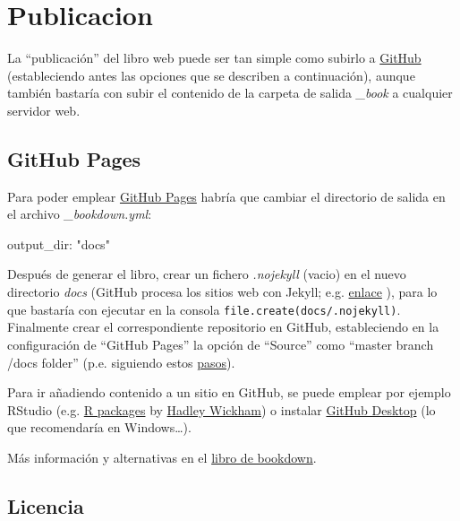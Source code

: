 \documentclass[]{book}
\newenvironment{Shaded}{\begin{snugshade}}{\end{snugshade}}
\newcommand{\StringTok}[1]{\textcolor[rgb]{0.31,0.60,0.02}{#1}}
\newcommand{\FunctionTok}[1]{\textcolor[rgb]{0.00,0.00,0.00}{#1}}
\newcommand{\AttributeTok}[1]{\textcolor[rgb]{0.77,0.63,0.00}{#1}}
\theoremstyle{definition}
\theoremstyle{definition}
\theoremstyle{definition}
\theoremstyle{remark}
\begin{document}
\chapter{Publicacion}\label{publicacion}

La ``publicación'' del libro web puede ser tan simple como subirlo a
\href{https://help.github.com}{GitHub} (estableciendo antes las opciones
que se describen a continuación), aunque también bastaría con subir el
contenido de la carpeta de salida \emph{\_book} a cualquier servidor
web.

\section{GitHub Pages}\label{github}

Para poder emplear \href{https://pages.github.com}{GitHub Pages} habría
que cambiar el directorio de salida en el archivo \emph{\_bookdown.yml}:

\begin{Shaded}
\begin{Highlighting}[]
\FunctionTok{output_dir:}\AttributeTok{ }\StringTok{"docs"}
\end{Highlighting}
\end{Shaded}

Después de generar el libro, crear un fichero \emph{.nojekyll} (vacio)
en el nuevo directorio \emph{docs} (GitHub procesa los sitios web con
Jekyll; e.g.
\href{https://help.github.com/articles/using-jekyll-as-a-static-site-generator-with-github-pages}{enlace}
), para lo que bastaría con ejecutar en la consola
\texttt{file.create(\textquotesingle{}docs/.nojekyll\textquotesingle{})}.
Finalmente crear el correspondiente repositorio en GitHub, estableciendo
en la configuración de ``GitHub Pages'' la opción de ``Source'' como
``master branch /docs folder'' (p.e. siguiendo estos
\href{https://help.github.com/articles/configuring-a-publishing-source-for-github-pages}{pasos}).

Para ir añadiendo contenido a un sitio en GitHub, se puede emplear por
ejemplo RStudio (e.g. \href{http://r-pkgs.had.co.nz/git.html}{R
packages} by \href{http://hadley.nz/\#code}{Hadley Wickham}) o instalar
\href{https://desktop.github.com}{GitHub Desktop} (lo que recomendaría
en Windows\ldots{}).

Más información y alternativas en el
\href{https://bookdown.org/yihui/bookdown/publishing.html}{libro de
bookdown}.

\section{Licencia}\label{licencia}
\end{document}
